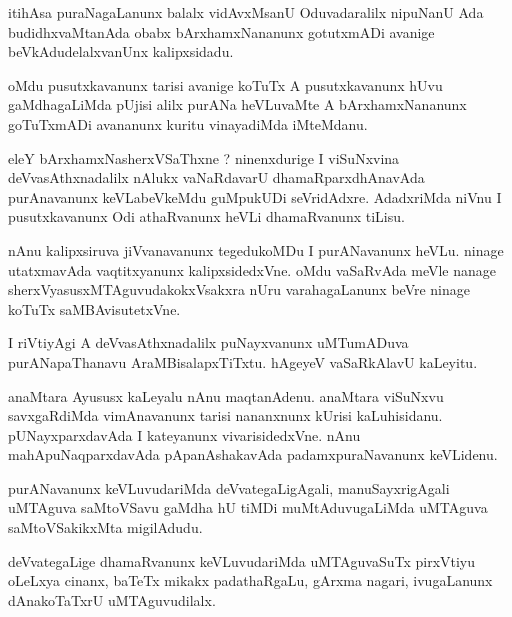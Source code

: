 \documentclass{article}
\begin{document}
\begin{mn}%
itihAsa puraNagaLanunx balalx vidAvxMsanU Oduvadaralilx nipuNanU Ada budidhxvaMtanAda obabx 
bArxhamxNananunx gotutxmADi avanige beVkAdudelalxvanUnx kalipxsidadu.
\end{mn}

\begin{mn}%
oMdu pusutxkavanunx tarisi avanige koTuTx A pusutxkavanunx hUvu gaMdhagaLiMda pUjisi alilx purANa 
heVLuvaMte A bArxhamxNananunx goTuTxmADi avananunx kuritu vinayadiMda iMteMdanu.
\end{mn}

\begin{mn}%
eleY bArxhamxNasherxVSaThxne ? ninenxdurige I viSuNxvina deVvasAthxnadalilx nAlukx vaNaRdavarU 
dhamaRparxdhAnavAda purAnavanunx keVLabeVkeMdu guMpukUDi seVridAdxre. AdadxriMda niVnu I 
pusutxkavanunx Odi athaRvanunx heVLi dhamaRvanunx tiLisu.
\end{mn}

\begin{mn}%
nAnu kalipxsiruva jiVvanavanunx tegedukoMDu I purANavanunx heVLu. ninage utatxmavAda vaqtitxyanunx 
kalipxsidedxVne. oMdu vaSaRvAda meVle nanage sherxVyasusxMTAguvudakokxVsakxra nUru varahagaLanunx 
beVre ninage koTuTx saMBAvisutetxVne.
\end{mn}

\begin{mn}%
I riVtiyAgi A deVvasAthxnadalilx puNayxvanunx uMTumADuva purANapaThanavu AraMBisalapxTiTxtu. hAgeyeV 
vaSaRkAlavU kaLeyitu.
\end{mn}

\begin{mn}%
anaMtara Ayususx kaLeyalu nAnu maqtanAdenu. anaMtara viSuNxvu savxgaRdiMda vimAnavanunx tarisi 
nananxnunx kUrisi kaLuhisidanu. pUNayxparxdavAda I kateyanunx vivarisidedxVne. nAnu 
mahApuNaqparxdavAda pApanAshakavAda padamxpuraNavanunx keVLidenu.
\end{mn}

\begin{mn}%
purANavanunx keVLuvudariMda deVvategaLigAgali, manuSayxrigAgali uMTAguva saMtoVSavu gaMdha hU tiMDi 
muMtAduvugaLiMda uMTAguva saMtoVSakikxMta migilAdudu.
\end{mn}

\begin{mn}%
deVvategaLige dhamaRvanunx keVLuvudariMda uMTAguvaSuTx pirxVtiyu oLeLxya cinanx, baTeTx mikakx 
padathaRgaLu, gArxma nagari, ivugaLanunx dAnakoTaTxrU uMTAguvudilalx.
\end{mn}
\end{document}
